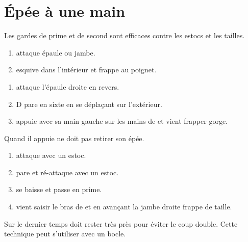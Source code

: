 \chapter{Épée à une main}


Les gardes de prime et de second sont efficaces contre les estocs et les tailles.


\begin{technique}

\begin{enumerate}
	\item \A attaque épaule ou jambe.
	
	\item \D esquive dans l'intérieur et frappe au poignet.
\end{enumerate}

\end{technique}


\begin{technique}

\begin{enumerate}
	\item \A attaque l'épaule droite en revers.
	
	\item D pare en sixte en se déplaçant sur l'extérieur.
	
	\item \D appuie avec sa main gauche sur les mains de \A et vient frapper gorge.
\end{enumerate}

Quand il appuie \D ne doit pas retirer son épée.

\end{technique}


\begin{technique}

\begin{enumerate}
	\item \A attaque avec un estoc.
	
	\item \D pare et ré-attaque avec un estoc.
	
	\item \A se baisse et passe en prime. 
	
	\item \A vient saisir le bras de \D et en avançant la jambe droite frappe de taille.
\end{enumerate}

Sur le dernier temps \A doit rester très près pour éviter le coup double.
Cette technique peut s'utiliser avec un bocle.

\end{technique}

